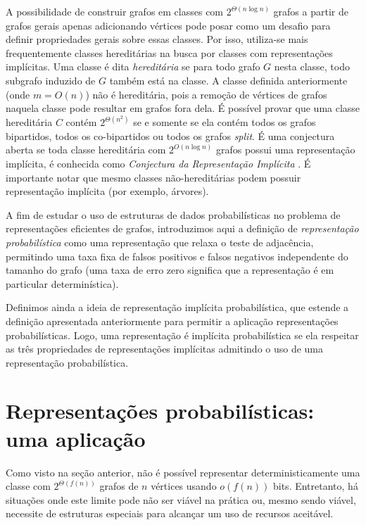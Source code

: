 A possibilidade de construir grafos em classes com $2^{\Theta(n\log n)}$ grafos a partir de grafos gerais apenas adicionando vértices pode posar como um desafio para definir propriedades gerais sobre essas classes. Por isso, utiliza-se mais frequentemente classes hereditárias na busca por classes com representações implícitas. Uma classe é dita \emph{hereditária} se para todo grafo $G$ nesta classe, todo subgrafo induzido de $G$ também está na classe. A classe definida anteriormente (onde $m = O(n)$) não é hereditária, pois a remoção de vértices de grafos naquela classe pode resultar em grafos fora dela. É possível provar que uma classe hereditária $C$ contém $2^{\Theta(n^2)}$ se e somente se ela contém todos os grafos bipartidos, todos os co-bipartidos ou todos os grafos \emph{split}. É uma conjectura aberta se toda classe hereditária com $2^{O(n \log n)}$ grafos possui uma representação implícita, é conhecida como \emph{Conjectura da Representação Implícita} \cite{kannan1992implicat,spinrad2003efficient,chandoo2016implicit}. É importante notar que mesmo classes não-hereditárias podem possuir representação implícita (por exemplo, árvores).

A fim de estudar o uso de estruturas de dados probabilísticas no problema de representações eficientes de grafos, introduzimos aqui a definição de \emph{representação probabilística} como uma representação que relaxa o teste de adjacência, permitindo uma taxa fixa de falsos positivos e falsos negativos independente do tamanho do grafo (uma taxa de erro zero significa que a representação é em particular determinística).

Definimos ainda a ideia de representação implícita probabilística, que estende a definição apresentada anteriormente para permitir a aplicação representações probabilísticas. Logo, uma representação é implícita probabilística se ela respeitar as três propriedades de representações implícitas admitindo o uso de uma representação probabilística.

\section{Representações probabilísticas: uma aplicação}\label{sec:graphs:example}

Como visto na seção anterior, não é possível representar deterministicamente uma classe com $2^{\Theta(f(n))}$ grafos de $n$ vértices usando $o(f(n))$ bits. Entretanto, há situações onde este limite pode não ser viável na prática ou, mesmo sendo viável, necessite de estruturas especiais para alcançar um uso de recursos aceitável.


